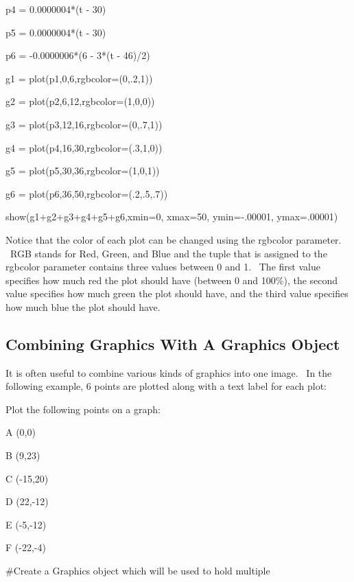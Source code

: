 \documentclass[12pt,twoside]{book}
\begin{document}
p4 = 0.0000004*(t {}- 30)

p5 = 0.0000004*(t {}- 30)

p6 = {}-0.0000006*(6 {}- 3*(t {}- 46)/2)



g1 = plot(p1,0,6,rgbcolor=(0,.2,1))

g2 = plot(p2,6,12,rgbcolor=(1,0,0))

g3 = plot(p3,12,16,rgbcolor=(0,.7,1))

g4 = plot(p4,16,30,rgbcolor=(.3,1,0))

g5 = plot(p5,30,36,rgbcolor=(1,0,1))

g6 = plot(p6,36,50,rgbcolor=(.2,.5,.7))


\bigskip

show(g1+g2+g3+g4+g5+g6,xmin=0, xmax=50, ymin={}-.00001, ymax=.00001)

{\textbar}


\bigskip

Notice that the color of each plot can be changed using the rgbcolor
parameter. \ RGB stands for Red, Green, and Blue and the tuple that is
assigned to the rgbcolor parameter contains three values between 0 and
1. \ The first value specifies how much red the plot should have
(between 0 and 100\%), the second value specifies how much green the
plot should have, and the third value specifies how much blue the plot
should have.

\subsection[Combining Graphics With A Graphics
Object]{Combining Graphics With A Graphics Object}
It is often useful to combine various kinds of graphics into one image.
\ In the following example, 6 points are plotted along with a text
label for each plot:

{\textquotedbl}{\textquotedbl}{\textquotedbl}

Plot the following points on a graph:


\bigskip

A (0,0)

B (9,23)

C ({}-15,20)

D (22,{}-12)

E ({}-5,{}-12)

F ({}-22,{}-4)

{\textquotedbl}{\textquotedbl}{\textquotedbl}


\bigskip

\#Create a Graphics object which will be used to hold multiple 
\end{document}
